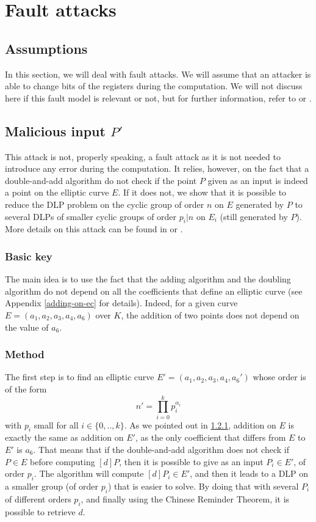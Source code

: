\documentclass[journal]{IEEEtran}
\begin{document}
\section{Fault attacks}
\label{fault}

\subsection{Assumptions}
In this section, we will deal with fault attacks. We will assume that an attacker is able to change bits of the registers
during the computation. We will not discuss here if this fault model is relevant or not, but for further information, 
refer to \cite{bar2006sorcerer} or \cite{giraud2004survey}.

\subsection{Malicious input $P'$}
\label{malicious}
This attack is not, properly speaking, a fault attack as it is not needed to introduce any 
error during the computation. It relies, however, on the fact that a double-and-add algorithm 
do not check if the point $P$ given as an input is indeed a point on the elliptic curve $E$.
If it does not, we show that it is possible to reduce the DLP problem on the cyclic group of order $n$ on $E$ generated by $P$ to 
several DLPs of smaller cyclic groups of order $p_i | n$ on $E_i$ (still generated by $P$).
More details on this attack can be found in \cite{biehl2000differential} or \cite{cohen2010handbook}.\\

\subsubsection{Basic key}
\label{malicious-basic}
The main idea is to use the fact that the adding algorithm and the doubling algorithm do not depend on 
all the coefficients that define an elliptic curve (see Appendix \ref{adding-on-ec} for details).
Indeed, for a given curve $E = (a_1, a_2, a_3, a_4, a_6)$ over $K$, the addition of two points does not
depend on the value of $a_6$.\\

\subsubsection{Method} 
The first step is to find an elliptic curve $E' = (a_1, a_2, a_3, a_4, a_6')$ whose order is of the form
$$n' = \prod_{i = 0}^{k}p_i^{\alpha_i}$$
with $p_i$ small for all $i \in \{0, .., k\}$. As we pointed out in \ref{malicious-basic}, addition on $E$ is 
exactly the same as addition on $E'$, as the only coefficient that differs from $E$ to $E'$ is $a_6$. That means 
that if the double-and-add algorithm does not check if $P \in E$ before computing $[d]P$, then it is possible to 
give as an input $P_i \in E'$, of order $p_i$. The algorithm will compute $[d]P_i \in E'$, and then it leads to a DLP on a smaller 
group (of order $p_i$) that is easier to solve. By doing that with several $P_i$ of different orders $p_i$, and finally using 
the Chinese Reminder Theorem, it is possible to retrieve $d$.
\end{document}
